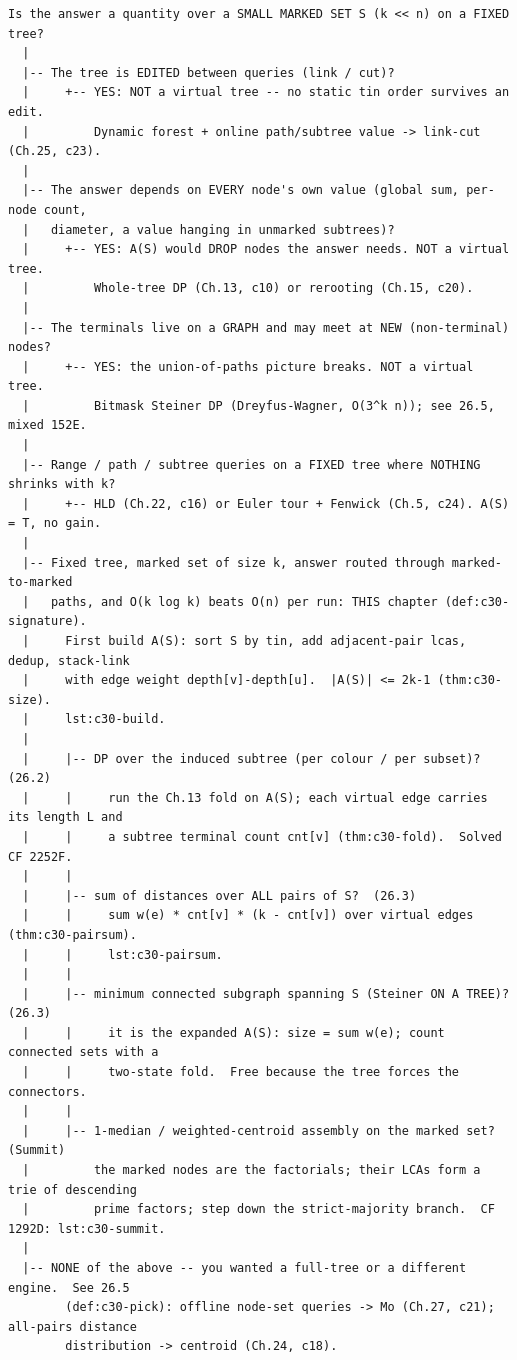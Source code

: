 \begin{lstlisting}[language={}, basicstyle=\ttfamily\small, numbers=none, frame=single]
  Is the answer a quantity over a SMALL MARKED SET S (k << n) on a FIXED tree?
  |
  |-- The tree is EDITED between queries (link / cut)?
  |     +-- YES: NOT a virtual tree -- no static tin order survives an edit.
  |         Dynamic forest + online path/subtree value -> link-cut (Ch.25, c23).
  |
  |-- The answer depends on EVERY node's own value (global sum, per-node count,
  |   diameter, a value hanging in unmarked subtrees)?
  |     +-- YES: A(S) would DROP nodes the answer needs. NOT a virtual tree.
  |         Whole-tree DP (Ch.13, c10) or rerooting (Ch.15, c20).
  |
  |-- The terminals live on a GRAPH and may meet at NEW (non-terminal) nodes?
  |     +-- YES: the union-of-paths picture breaks. NOT a virtual tree.
  |         Bitmask Steiner DP (Dreyfus-Wagner, O(3^k n)); see 26.5, mixed 152E.
  |
  |-- Range / path / subtree queries on a FIXED tree where NOTHING shrinks with k?
  |     +-- HLD (Ch.22, c16) or Euler tour + Fenwick (Ch.5, c24). A(S) = T, no gain.
  |
  |-- Fixed tree, marked set of size k, answer routed through marked-to-marked
  |   paths, and O(k log k) beats O(n) per run: THIS chapter (def:c30-signature).
  |     First build A(S): sort S by tin, add adjacent-pair lcas, dedup, stack-link
  |     with edge weight depth[v]-depth[u].  |A(S)| <= 2k-1 (thm:c30-size).
  |     lst:c30-build.
  |
  |     |-- DP over the induced subtree (per colour / per subset)?  (26.2)
  |     |     run the Ch.13 fold on A(S); each virtual edge carries its length L and
  |     |     a subtree terminal count cnt[v] (thm:c30-fold).  Solved CF 2252F.
  |     |
  |     |-- sum of distances over ALL pairs of S?  (26.3)
  |     |     sum w(e) * cnt[v] * (k - cnt[v]) over virtual edges (thm:c30-pairsum).
  |     |     lst:c30-pairsum.
  |     |
  |     |-- minimum connected subgraph spanning S (Steiner ON A TREE)?  (26.3)
  |     |     it is the expanded A(S): size = sum w(e); count connected sets with a
  |     |     two-state fold.  Free because the tree forces the connectors.
  |     |
  |     |-- 1-median / weighted-centroid assembly on the marked set?  (Summit)
  |         the marked nodes are the factorials; their LCAs form a trie of descending
  |         prime factors; step down the strict-majority branch.  CF 1292D: lst:c30-summit.
  |
  |-- NONE of the above -- you wanted a full-tree or a different engine.  See 26.5
        (def:c30-pick): offline node-set queries -> Mo (Ch.27, c21); all-pairs distance
        distribution -> centroid (Ch.24, c18).
\end{lstlisting}


